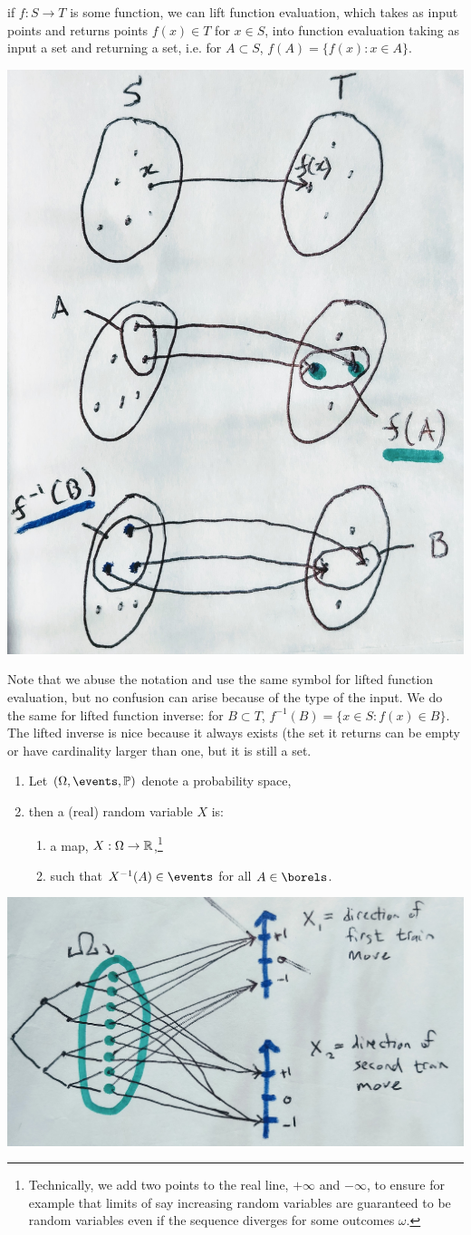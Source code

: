\documentclass{article}
\begin{document}
 if $f : S \to T$ is some function, we can lift function evaluation, which takes as input points and returns points $f(x) \in T$ for $x \in S$, into function evaluation taking as input a set and returning a set, i.e. for $A \subset S$, $f(A) = \{f(x) : x \in A\}$. 
\begin{center}
	\includegraphics[width=0.3\linewidth]{figures/maps}
\end{center}
Note that we abuse the notation and use the same symbol for lifted function evaluation, but no confusion can arise because of the type of the input. We do the same for lifted function inverse: for $B \subset T$, $f^{-1}(B) = \{x \in S : f(x) \in B\}$. The lifted inverse is nice because it always exists (the set it returns can be empty or have cardinality larger than one, but it is still a set.

\begin{enumerate}
  \item Let $(\Omega, \events, \P)$ denote a probability space,
  \item then a (real) random variable $X$ is:
  \begin{enumerate}
    \item a map, $X : \Omega \to {\mathbb R}$,\footnote{Technically, we add two points to the real line, $+\infty$ and $-\infty$, to ensure for example that limits of say increasing random variables are guaranteed to be random variables even if the sequence diverges for some outcomes $\omega$.} 
    \item \label{rv:condition} such that $X^{-1}(A) \in \events$ for all $A \in \borels$.
  \end{enumerate}
\end{enumerate}
\begin{center}
	\includegraphics[width=0.6\linewidth]{figures/rvs}
\end{center}
\end{document}
